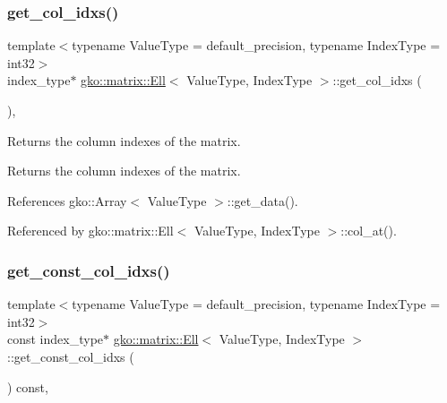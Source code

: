 \mbox{\label{classgko_1_1matrix_1_1Ell_ac80ca9482997e97d88425214fd1b8aef}} 
\subsubsection{\texorpdfstring{get\+\_\+col\+\_\+idxs()}{get\_col\_idxs()}}
{\footnotesize\ttfamily template$<$typename Value\+Type = default\+\_\+precision, typename Index\+Type = int32$>$ \\
index\+\_\+type$\ast$ \hyperlink{classgko_1_1matrix_1_1Ell}{gko\+::matrix\+::\+Ell}$<$ Value\+Type, Index\+Type $>$\+::get\+\_\+col\+\_\+idxs (\begin{DoxyParamCaption}{ }\end{DoxyParamCaption})\hspace{0.3cm}{\ttfamily [inline]}, {\ttfamily [noexcept]}}



Returns the column indexes of the matrix. 

\begin{DoxyReturn}{Returns}
the column indexes of the matrix. 
\end{DoxyReturn}


References gko\+::\+Array$<$ Value\+Type $>$\+::get\+\_\+data().



Referenced by gko\+::matrix\+::\+Ell$<$ Value\+Type, Index\+Type $>$\+::col\+\_\+at().

\mbox{\label{classgko_1_1matrix_1_1Ell_addb3c84f52b090c75f519833fb379cef}} 
\subsubsection{\texorpdfstring{get\+\_\+const\+\_\+col\+\_\+idxs()}{get\_const\_col\_idxs()}}
{\footnotesize\ttfamily template$<$typename Value\+Type = default\+\_\+precision, typename Index\+Type = int32$>$ \\
const index\+\_\+type$\ast$ \hyperlink{classgko_1_1matrix_1_1Ell}{gko\+::matrix\+::\+Ell}$<$ Value\+Type, Index\+Type $>$\+::get\+\_\+const\+\_\+col\+\_\+idxs (\begin{DoxyParamCaption}{ }\end{DoxyParamCaption}) const\hspace{0.3cm}{\ttfamily [inline]}, {\ttfamily [noexcept]}}



